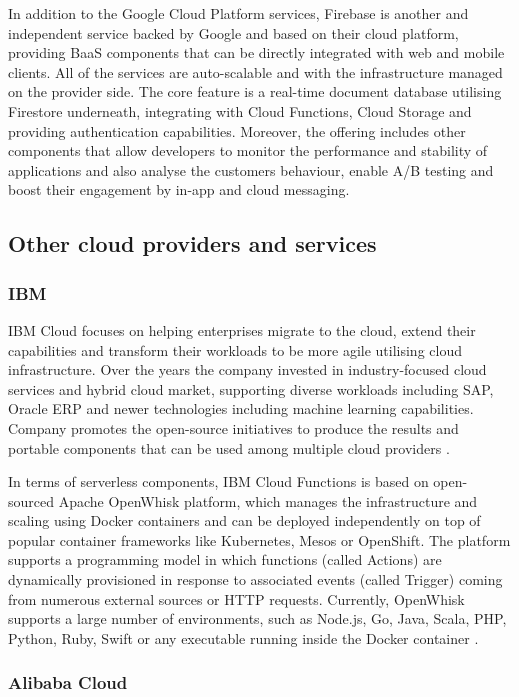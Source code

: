 In addition to the Google Cloud Platform services, Firebase \cite{Firebase} is another and independent service backed by Google and based on their cloud platform, providing BaaS components that can be directly integrated with web and mobile clients. All of the services are auto-scalable and with the infrastructure managed on the provider side. The core feature is a real-time document database utilising Firestore underneath, integrating with Cloud Functions, Cloud Storage and providing authentication capabilities. Moreover, the offering includes other components that allow developers to monitor the performance and stability of applications and also analyse the customers behaviour, enable A/B testing and boost their engagement by in-app and cloud messaging.

\subsection{Other cloud providers and services}

\subsubsection*{IBM}
IBM Cloud focuses on helping enterprises migrate to the cloud, extend their capabilities and transform their workloads to be more agile utilising cloud infrastructure. Over the years the company invested in industry-focused cloud services and hybrid cloud market, supporting diverse workloads including SAP, Oracle ERP and newer technologies including machine learning capabilities. Company promotes the open-source initiatives to produce the results and portable components that can be used among multiple cloud providers \cite{Gartner}.

In terms of serverless components, IBM Cloud Functions is based on open-sourced Apache OpenWhisk platform, which manages the infrastructure and scaling using Docker containers and can be deployed independently on top of popular container frameworks like Kubernetes, Mesos or OpenShift. The platform supports a programming model in which functions (called Actions) are dynamically provisioned in response to associated events (called Trigger) coming from numerous external sources or HTTP requests. Currently, OpenWhisk supports a large number of environments, such as Node.js, Go, Java, Scala, PHP, Python, Ruby, Swift or any executable running inside the Docker container \cite{ApacheOpenWhisk}.

\subsubsection*{Alibaba Cloud}

